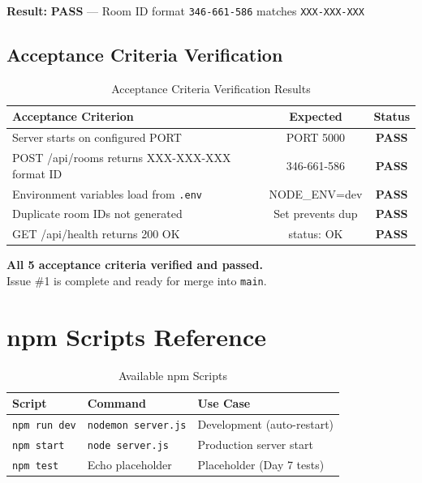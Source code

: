 \documentclass[11pt,a4paper]{article}
\begin{document}
\textbf{Result:} \textcolor{successgreen}{\textbf{PASS}}  --- Room ID format \texttt{346-661-586} matches \texttt{XXX-XXX-XXX}

\subsection{Acceptance Criteria Verification}

\begin{table}[h!]
\centering
\begin{tabular}{@{}lcc@{}}
\toprule
\textbf{Acceptance Criterion} & \textbf{Expected} & \textbf{Status} \\ \midrule
Server starts on configured PORT                     & PORT 5000         & \textcolor{successgreen}{\textbf{PASS}} \\
POST /api/rooms returns XXX-XXX-XXX format ID        & 346-661-586       & \textcolor{successgreen}{\textbf{PASS}} \\
Environment variables load from \texttt{.env}        & NODE\_ENV=dev     & \textcolor{successgreen}{\textbf{PASS}} \\
Duplicate room IDs not generated                     & Set prevents dup  & \textcolor{successgreen}{\textbf{PASS}} \\
GET /api/health returns 200 OK                       & status: OK        & \textcolor{successgreen}{\textbf{PASS}} \\ \bottomrule
\end{tabular}
\caption{Acceptance Criteria Verification Results}
\label{tab:acceptance}
\end{table}

\vspace{1em}
\begin{infoblock}
\textbf{All 5 acceptance criteria verified and passed.}\\
Issue \#1 is complete and ready for merge into \texttt{main}.
\end{infoblock}

\newpage

\section{npm Scripts Reference}

\begin{table}[h!]
\centering
\begin{tabular}{@{}lll@{}}
\toprule
\textbf{Script} & \textbf{Command} & \textbf{Use Case} \\ \midrule
\texttt{npm run dev}   & \texttt{nodemon server.js} & Development (auto-restart) \\
\texttt{npm start}     & \texttt{node server.js}    & Production server start \\
\texttt{npm test}      & Echo placeholder           & Placeholder (Day 7 tests) \\ \bottomrule
\end{tabular}
\caption{Available npm Scripts}
\label{tab:npm_scripts}
\end{table}
\end{document}
